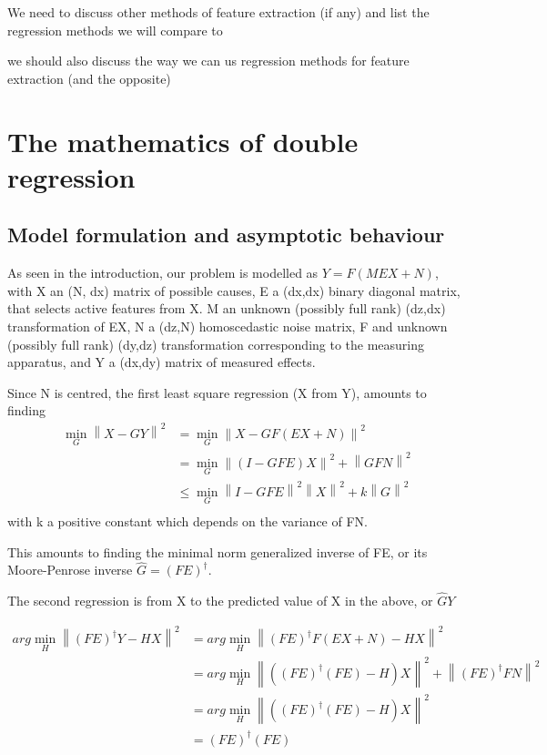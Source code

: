 \documentclass{article}
\begin{document}
We need to discuss other methods of feature extraction (if any) and list the regression methods we will compare to

we should also discuss the way we can us regression methods for feature extraction (and the opposite)

\section{The mathematics of double regression}

\subsection{Model formulation and asymptotic behaviour}

As seen in the introduction, our problem is modelled as $Y = F(MEX + N)$, with X an (N, dx) matrix of possible causes, E a (dx,dx) binary diagonal matrix, that selects active features from X. M an unknown (possibly full rank) (dz,dx) transformation of EX, N a (dz,N) homoscedastic noise matrix, F and unknown (possibly full rank) (dy,dz) transformation corresponding to the measuring apparatus, and Y a (dx,dy) matrix of measured effects.

Since N is centred, the first least square regression (X from Y), amounts to finding
\begin{equation}
\begin{aligned}
\min_G \left \| X-GY \right \|^2 &= \min_G \left \| X - GF(EX+N)\right\|^2 \\
&{}= \min_G \left \| (I-GFE)X\right\| ^2 + \left \| GFN\right \| ^2\\
&{}\leq \min_G \left \| I-GFE\right\| ^2 \left \| X\right\| ^2 + k\left \| G\right \| ^2\\ 
\end{aligned}
\end{equation}
with k a positive constant which depends on the variance of FN.

This amounts to finding the minimal norm generalized inverse of FE, or its Moore-Penrose inverse $\hat  G= (FE)^{\dagger}$.

The second regression is from X to the predicted value of X in the above, or $\hat G  Y$

\begin{equation}
\begin{aligned}
arg \min_H \left \| (FE)^{\dagger}Y - HX \right \|^2 &= arg \min_H \left \| (FE)^{\dagger}F(EX+N) - HX \right \|^2 \\
&= arg \min_H \left \| ((FE)^{\dagger}(FE)-H)X \right \| ^2 + \left \| (FE)^{\dagger}FN \right \| ^2\\
&= arg \min_H \left \| ((FE)^{\dagger}(FE)-H)X \right \| ^2\\
&=(FE)^{\dagger}(FE)
\end{aligned}
\end{equation}
\end{document}
